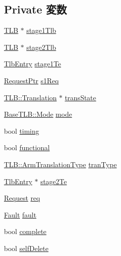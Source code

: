\subsection*{Private 変数}
\begin{DoxyCompactItemize}
\item 
\hyperlink{classArmISA_1_1TLB}{TLB} $\ast$ \hyperlink{classArmISA_1_1Stage2LookUp_a6f8ba3bba35a18bf30906cf8577b620c}{stage1Tlb}
\item 
\hyperlink{classArmISA_1_1TLB}{TLB} $\ast$ \hyperlink{classArmISA_1_1Stage2LookUp_a2188cef93e9eb4ac6383c0ca4f44dc36}{stage2Tlb}
\item 
\hyperlink{structArmISA_1_1TlbEntry}{TlbEntry} \hyperlink{classArmISA_1_1Stage2LookUp_ab6c4a5c78de5d41ef8fee03ac193fd3f}{stage1Te}
\item 
\hyperlink{classRequest}{RequestPtr} \hyperlink{classArmISA_1_1Stage2LookUp_a424b8aa18e404f1966faa535fb66bbb9}{s1Req}
\item 
\hyperlink{classBaseTLB_1_1Translation}{TLB::Translation} $\ast$ \hyperlink{classArmISA_1_1Stage2LookUp_ab84349f9e7472233bc23dfdc0968ba57}{transState}
\item 
\hyperlink{classBaseTLB_a46c8a310cf4c094f8c80e1cb8dc1f911}{BaseTLB::Mode} \hyperlink{classArmISA_1_1Stage2LookUp_ae9b5adf8be89a72128708c7e621e7211}{mode}
\item 
bool \hyperlink{classArmISA_1_1Stage2LookUp_a20f65ad56869382ed8681b9dd1aa85d6}{timing}
\item 
bool \hyperlink{classArmISA_1_1Stage2LookUp_a4f60754b74e2d1584c06199ae5b75f21}{functional}
\item 
\hyperlink{classArmISA_1_1TLB_ad6f5d480df151d5bddeefc6271793f08}{TLB::ArmTranslationType} \hyperlink{classArmISA_1_1Stage2LookUp_a4dbccde8be57f0db41d7dd786c199318}{tranType}
\item 
\hyperlink{structArmISA_1_1TlbEntry}{TlbEntry} $\ast$ \hyperlink{classArmISA_1_1Stage2LookUp_a68a5b71c5cd8897c9bbade8a51aa0a8f}{stage2Te}
\item 
\hyperlink{classRequest}{Request} \hyperlink{classArmISA_1_1Stage2LookUp_a76fdf11ae9d2e0af47b6362edcc4aaef}{req}
\item 
\hyperlink{classRefCountingPtr}{Fault} \hyperlink{classArmISA_1_1Stage2LookUp_a68714ceb74c60ea7ef5dec335bb6c5d7}{fault}
\item 
bool \hyperlink{classArmISA_1_1Stage2LookUp_af6b1fef28954e41d75acf35f76bc8d39}{complete}
\item 
bool \hyperlink{classArmISA_1_1Stage2LookUp_aacbf877568c7a210b211a528ba0f9aa9}{selfDelete}
\end{DoxyCompactItemize}


